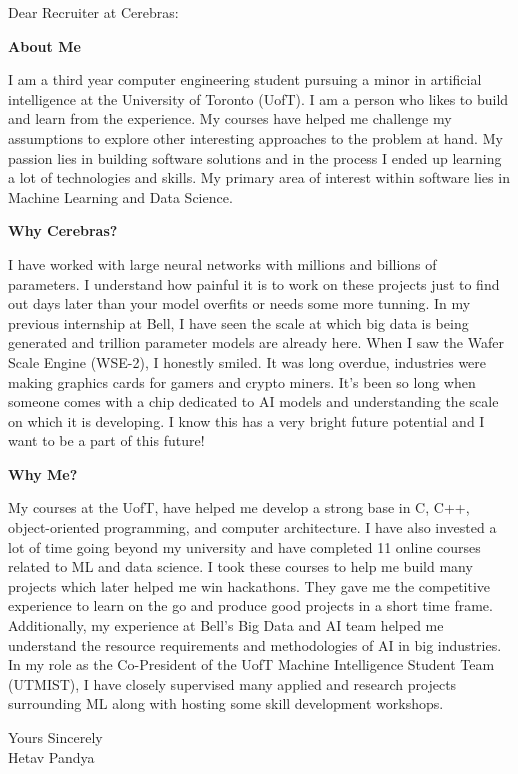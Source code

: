 \documentclass[a4paper,english]{friggeri-letter}
\begin{document}

\address{
   310 Bloor St W \\
   Toronto, ON, Canada
}





\opening{Dear Recruiter at Cerebras:}

\textbf{About Me}

I am a third year computer engineering student pursuing a minor in artificial intelligence at the University of Toronto (UofT). I am a person who likes to build and learn from the experience. My courses have helped me challenge my assumptions to explore other interesting approaches to the problem at hand. My passion lies in building software solutions and in the process I ended up learning a lot of technologies and skills. My primary area of interest within software lies in Machine Learning and Data Science.

\textbf{Why Cerebras?}

I have worked with large neural networks with millions and billions of parameters. I understand how painful it is to work on these projects just to find out days later than your model overfits or needs some more tunning. In my previous internship at Bell, I have seen the scale at which big data is being generated and trillion parameter models are already here. When I saw the Wafer Scale Engine (WSE-2), I honestly smiled. It was long overdue, industries were making graphics cards for gamers and crypto miners. It's been so long when someone comes with a chip dedicated to AI models and understanding the scale on which it is developing. I know this has a very bright future potential and I want to be a part of this future!

\textbf{Why Me?}

My courses at the UofT, have helped me develop a strong base in C, C++, object-oriented programming, and computer architecture. I have also invested a lot of time going beyond my university and have completed 11 online courses related to ML and data science. I took these courses to help me build many projects which later helped me win hackathons. They gave me the competitive experience to learn on the go and produce good projects in a short time frame. Additionally, my experience at Bell's Big Data and AI team helped me understand the resource requirements and methodologies of AI in big industries. In my role as the Co-President of the UofT Machine Intelligence Student Team (UTMIST), I have closely supervised many applied and research projects surrounding ML along with hosting some skill development workshops.

\vspace*{0.1cm}
\closing{
   Yours Sincerely\\
   Hetav Pandya}
\end{document}
